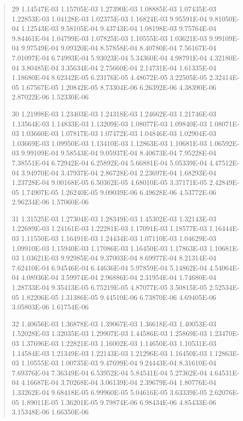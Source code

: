\documentclass[letterpaper,10pt,english]{sphinxmanual}
\begin{document}
\begin{quote}
\begin{DUlineblock}{0em}
\item[] 29   1.14547E-03  1.15705E-03  1.27390E-03  1.08885E-03  1.07435E-03  1.22853E-03  1.04128E-03  1.02375E-03  1.16824E-03  9.95591E-04  9.81050E-04  1.12543E-03  9.58105E-04  9.43743E-04  1.08198E-03  9.75764E-04  9.84461E-04  1.04799E-03  1.07825E-03  1.10555E-03  1.03621E-03  9.99109E-04  9.97549E-04  9.09320E-04  8.57858E-04  8.40780E-04  7.56167E-04  7.01097E-04  6.74993E-04  5.93023E-04  5.34360E-04  4.98791E-04  4.32180E-04  3.80485E-04  3.35634E-04  2.75660E-04  2.14731E-04  1.61335E-04  1.18680E-04  8.62342E-05  6.23176E-05  4.48672E-05  3.22505E-05  2.32414E-05  1.67567E-05  1.20842E-05  8.73304E-06  6.26392E-06  4.38390E-06  2.87022E-06  1.52330E-06
\item[] 30   1.21998E-03  1.23403E-03  1.24318E-03  1.24662E-03  1.21746E-03  1.13564E-03  1.14833E-03  1.13209E-03  1.08077E-03  1.09840E-03  1.08071E-03  1.03660E-03  1.07817E-03  1.07472E-03  1.04846E-03  1.02904E-03  1.03669E-03  1.09950E-03  1.13410E-03  1.12863E-03  1.10681E-03  1.06592E-03  9.99109E-04  9.58543E-04  9.05937E-04  8.40673E-04  7.95228E-04  7.38551E-04  6.72942E-04  6.25892E-04  5.66881E-04  5.05339E-04  4.47512E-04  3.94970E-04  3.47937E-04  2.86728E-04  2.23697E-04  1.68293E-04  1.23728E-04  9.00168E-05  6.50362E-05  4.68010E-05  3.37171E-05  2.42849E-05  1.74907E-05  1.26240E-05  9.09039E-06  6.49628E-06  4.53772E-06  2.96234E-06  1.57060E-06
\item[] 31   1.31525E-03  1.27304E-03  1.28349E-03  1.45302E-03  1.32143E-03  1.22689E-03  1.24161E-03  1.22281E-03  1.17091E-03  1.18577E-03  1.16444E-03  1.11550E-03  1.16491E-03  1.24434E-03  1.07110E-03  1.04629E-03  1.09910E-03  1.15940E-03  1.17086E-03  1.16450E-03  1.17863E-03  1.10681E-03  1.03621E-03  9.92985E-04  9.37003E-04  8.69977E-04  8.21314E-04  7.62410E-04  6.94546E-04  6.44636E-04  5.97859E-04  5.14862E-04  4.54064E-04  4.08936E-04  3.59974E-04  2.96886E-04  2.31954E-04  1.74680E-04  1.28733E-04  9.35413E-05  6.75219E-05  4.87077E-05  3.50815E-05  2.52534E-05  1.82206E-05  1.31386E-05  9.44510E-06  6.73870E-06  4.69405E-06  3.05803E-06  1.61754E-06
\item[] 32   1.40656E-03  1.36878E-03  1.39067E-03  1.36618E-03  1.40053E-03  1.52028E-03  1.32035E-03  1.29907E-03  1.44586E-03  1.25869E-03  1.23470E-03  1.37696E-03  1.22821E-03  1.16002E-03  1.14650E-03  1.10531E-03  1.14584E-03  1.21349E-03  1.22143E-03  1.21296E-03  1.16450E-03  1.12863E-03  1.10555E-03  1.00735E-03  9.47699E-04  9.24443E-04  8.31610E-04  7.69376E-04  7.36349E-04  6.53952E-04  5.84541E-04  5.27362E-04  4.64531E-04  4.16687E-04  3.70268E-04  3.06139E-04  2.39679E-04  1.80776E-04  1.33262E-04  9.68418E-05  6.99960E-05  5.04616E-05  3.63339E-05  2.62076E-05  1.89011E-05  1.36201E-05  9.79874E-06  6.98434E-06  4.85433E-06  3.15348E-06  1.66350E-06

\end{DUlineblock}
\end{quote}
\end{document}
